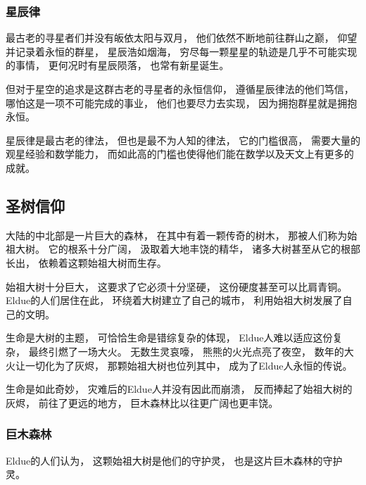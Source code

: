 \documentclass[UTF8,12pt,draft]{ctexbook}
\begin{document}
                \subsubsection{星辰律}
                    最古老的寻星者们并没有皈依太阳与双月，
                    他们依然不断地前往群山之巅，
                    仰望并记录着永恒的群星，
                    星辰浩如烟海，
                    穷尽每一颗星星的轨迹是几乎不可能实现的事情，
                    更何况时有星辰陨落，
                    也常有新星诞生。

                    但对于星空的追求是这群古老的寻星者的永恒信仰，
                    遵循星辰律法的他们笃信，
                    哪怕这是一项不可能完成的事业，
                    他们也要尽力去实现，
                    因为拥抱群星就是拥抱永恒。

                    星辰律是最古老的律法，
                    但也是最不为人知的律法，
                    它的门槛很高，
                    需要大量的观星经验和数学能力，
                    而如此高的门槛也使得他们能在数学以及天文上有更多的成就。
            \subsection{圣树信仰}
                大陆的中北部是一片巨大的森林，
                在其中有着一颗传奇的树木，
                那被人们称为始祖大树。
                它的根系十分广阔，
                汲取着大地丰饶的精华，
                诸多大树甚至从它的根部长出，
                依赖着这颗始祖大树而生存。

                始祖大树十分巨大，
                这要求了它必须十分坚硬，
                这份硬度甚至可以比肩青铜。
                Eldue的人们居住在此，
                环绕着大树建立了自己的城市，
                利用始祖大树发展了自己的文明。

                生命是大树的主题，
                可恰恰生命是错综复杂的体现，
                Eldue人难以适应这份复杂，
                最终引燃了一场大火。
                无数生灵哀嚎，
                熊熊的火光点亮了夜空，
                数年的大火让一切化为了灰烬，
                那颗始祖大树也位列其中，
                成为了Eldue人永恒的传说。

                生命是如此奇妙，
                灾难后的Eldue人并没有因此而崩溃，
                反而捧起了始祖大树的灰烬，
                前往了更远的地方，
                巨木森林比以往更广阔也更丰饶。
                \subsubsection{巨木森林}
                Eldue的人们认为，
                这颗始祖大树是他们的守护灵，
                也是这片巨木森林的守护灵。
\end{document}
